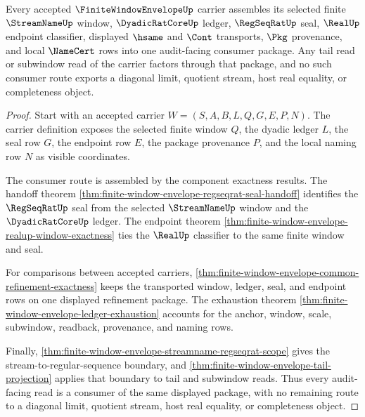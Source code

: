 \begin{theorem}
\label{thm:finite-window-envelope-tail-projection-audit-sync}
Every accepted $\FiniteWindowEnvelopeUp$ carrier assembles its selected finite $\StreamNameUp$ window, $\DyadicRatCoreUp$ ledger, $\RegSeqRatUp$ seal, $\RealUp$ endpoint classifier, displayed $\hsame$ and $\Cont$ transports, $\Pkg$ provenance, and local $\NameCert$ rows into one audit-facing consumer package. Any tail read or subwindow read of the carrier factors through that package, and no such consumer route exports a diagonal limit, quotient stream, host real equality, or completeness object.
\end{theorem}
\begin{proof}
Start with an accepted carrier $W=(S,A,B,L,Q,G,E,P,N)$. The carrier definition exposes the selected finite window $Q$, the dyadic ledger $L$, the seal row $G$, the endpoint row $E$, the package provenance $P$, and the local naming row $N$ as visible coordinates.

The consumer route is assembled by the component exactness results. The handoff theorem \autoref{thm:finite-window-envelope-regseqrat-seal-handoff} identifies the $\RegSeqRatUp$ seal from the selected $\StreamNameUp$ window and the $\DyadicRatCoreUp$ ledger. The endpoint theorem \autoref{thm:finite-window-envelope-realup-window-exactness} ties the $\RealUp$ classifier to the same finite window and seal.

For comparisons between accepted carriers, \autoref{thm:finite-window-envelope-common-refinement-exactness} keeps the transported window, ledger, seal, and endpoint rows on one displayed refinement package. The exhaustion theorem \autoref{thm:finite-window-envelope-ledger-exhaustion} accounts for the anchor, window, scale, subwindow, readback, provenance, and naming rows.

Finally, \autoref{thm:finite-window-envelope-streamname-regseqrat-scope} gives the stream-to-regular-sequence boundary, and \autoref{thm:finite-window-envelope-tail-projection} applies that boundary to tail and subwindow reads. Thus every audit-facing read is a consumer of the same displayed package, with no remaining route to a diagonal limit, quotient stream, host real equality, or completeness object.
\end{proof}


